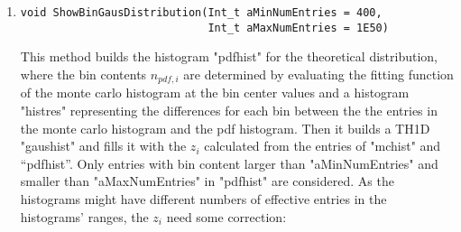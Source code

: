 \begin{enumerate}
\begin{gather}
= \mean{Q(\mean{E_{Ion}},\mean{E_{Heat}}) + \frac{\partial Q}{\partial E_{Ion}} \frac{\partial Q}{E_{Heat}} (E_{Ion} - \mean{E_{Ion}})(E_{Heat} - \mean{E_{Heat}}) + \right. \\ \left. \frac{1}{2} \frac{\partial^2 Q}{\partial E_{Ion}^2} (E_{Ion} - \mean{E_{Ion}})^2 + \frac{1}{2} \frac{\partial^2 Q}{\partial E_{Heat}^2} (E_{Heat} - \mean{E_{Heat}})^2 + \mathcal O \left( \begin{pmatrix} E_{Ion} - \mean{E_{Ion}} \\ E_{Heat} - \mean{E_{Heat}} \end{pmatrix}^3 \right)} \\
= \overline{Q} + \left( \frac{1}{\mean{E_{Recoil}}} + \frac{V}{\epsilon_\gamma} \frac{\mean{E_{Ion}}}{\mean{E_{Recoil}}^2} \right) \left( 1 + \frac{V}{\epsilon_\gamma} \right) \frac{\mean{E_{Ion}}}{\mean{E_{Recoil}}^2} \sigma_{Ion-Heat}^2 \\ +  \left( \frac{V}{\epsilon_\gamma} \frac{1}{\mean{E_{Recoil}}^2} \right) \left( 1 +  \frac{V}{\epsilon_\gamma} \frac{\mean{E_{Ion}}}{\mean{E_{Recoil}}} \right) \sigma_{Ion}^2 + \left(1 + \frac{V}{\epsilon_\gamma} \right)^2 \frac{\mean{E_{Ion}}}{\mean{E_{Recoil}}^3} \sigma_{Heat}^2 + \mathcal O \left(\mean{ \begin{pmatrix} E_{Ion} - \mean{E_{Ion}} \\ E_{Heat} - \mean{E_{Heat}} \end{pmatrix}^3} \right)
\end{gather}
If the covariance matrix of $\begin{pmatrix} E_{Ion} \\ E_{Heat} \end{pmatrix}$ has very small entries, the square terms can be neglected.
Additionally "`mchist"' is fitted with the pdf "`fkt"' alias 'f' and "`aFitOption"' and the histogram is stored in a ROOT file:
\begin{quote}
<$E_{Ion}$>\_<$E_{Heat}$>\_<$\sigma_{E_{Ion}}$>\_<$\sigma_{E_{Heat}}$>.root
\end{quote}
\item
\begin{verbatim}
void ShowBinGausDistribution(Int_t aMinNumEntries = 400,
                             Int_t aMaxNumEntries = 1E50)
\end{verbatim}
This method builds the histogram "pdfhist" for the theoretical distribution, where the bin contents $n_{pdf,i}$ are determined by evaluating the fitting function of the monte carlo histogram at the bin center values and a histogram "histres" representing the differences for each bin between the the entries in the monte carlo histogram and the pdf histogram. Then it builds a TH1D "gaushist" and fills it with the $z_i$ calculated from the entries of "mchist" and "`pdfhist"'. Only entries with bin content larger than "aMinNumEntries" and smaller than "aMaxNumEntries" in "pdfhist" are considered. As the histograms might have different numbers of effective entries in the histograms' ranges, the $z_i$ need some correction:

\end{enumerate}
